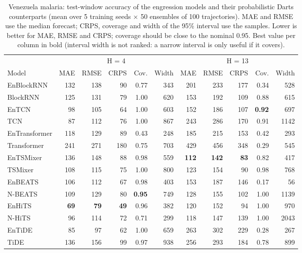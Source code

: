 \begin{table}[t]
\centering\small
\caption{Venezuela malaria: test-window accuracy of the engression models and their probabilistic Darts counterparts (mean over 5 training seeds $\times$ 50 ensembles of 100 trajectories). MAE and RMSE use the median forecast; CRPS, coverage and width of the 95\% interval use the samples. Lower is better for MAE, RMSE and CRPS; coverage should be close to the nominal 0.95. Best value per column in bold (interval width is not ranked: a narrow interval is only useful if it covers).}
\label{tab:malaria}
\begin{tabular}{lrrrrrrrrrr}
\toprule
 & \multicolumn{5}{c}{H = 4} & \multicolumn{5}{c}{H = 13} \\
\cmidrule(lr){2-6} \cmidrule(lr){7-11}
Model & MAE & RMSE & CRPS & Cov. & Width & MAE & RMSE & CRPS & Cov. & Width \\
\midrule
EnBlockRNN & 132 & 138 & 90 & 0.77 & 343 & 201 & 233 & 177 & 0.34 & 528 \\
BlockRNN & 125 & 131 & 79 & 1.00 & 620 & 153 & 192 & 109 & 0.88 & 615 \\
\addlinespace[2pt]
EnTCN & 98 & 105 & 64 & 1.00 & 603 & 152 & 186 & 107 & \textbf{0.92} & 697 \\
TCN & 87 & 112 & 76 & 1.00 & 867 & 243 & 286 & 170 & 0.91 & 1142 \\
\addlinespace[2pt]
EnTransformer & 118 & 129 & 89 & 0.43 & 248 & 185 & 215 & 153 & 0.42 & 293 \\
Transformer & 241 & 271 & 180 & 0.75 & 703 & 429 & 456 & 348 & 0.29 & 545 \\
\addlinespace[2pt]
EnTSMixer & 136 & 148 & 88 & 0.98 & 559 & \textbf{112} & \textbf{142} & \textbf{83} & 0.82 & 417 \\
TSMixer & 108 & 115 & 75 & 1.00 & 800 & 123 & 154 & 90 & 0.98 & 768 \\
\addlinespace[2pt]
EnBEATS & 106 & 112 & 67 & 0.98 & 403 & 153 & 187 & 146 & 0.17 & 56 \\
N-BEATS & 109 & 129 & 80 & \textbf{0.95} & 749 & 128 & 155 & 102 & 1.00 & 1139 \\
\addlinespace[2pt]
EnHiTS & \textbf{69} & \textbf{79} & \textbf{49} & 0.96 & 382 & 120 & 152 & 94 & 1.00 & 970 \\
N-HiTS & 96 & 114 & 72 & 0.71 & 299 & 118 & 147 & 139 & 1.00 & 2043 \\
\addlinespace[2pt]
EnTiDE & 85 & 97 & 62 & 1.00 & 659 & 263 & 302 & 229 & 0.28 & 267 \\
TiDE & 136 & 156 & 99 & 0.97 & 938 & 256 & 293 & 184 & 0.78 & 899 \\
\bottomrule
\end{tabular}
\end{table}